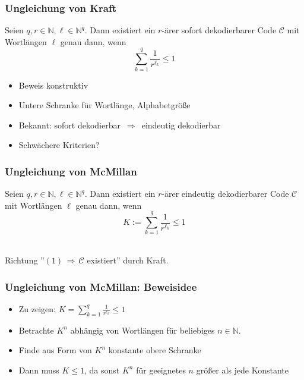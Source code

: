 \documentclass{beamer}
\begin{document}
\begin{frame}[t]
    \frametitle{Ungleichung von Kraft}
    Seien $q,r \in \mathbb{N}, \ell \in \mathbb{N}^q$. Dann existiert ein $r$-ärer sofort dekodierbarer Code $\mathcal{C}$
    mit Wortlängen $\ell$ genau dann, wenn
    $$
        \sum_{k=1}^{q} \frac{1}{r^{\ell_k}} \leq 1
    $$
    \begin{itemize}
        \setlength\itemsep{1em}
        \item Beweis konstruktiv
        \item Untere Schranke für Wortlänge, Alphabetgröße
        \setlength\itemsep{3em}
        \pause
        \item Bekannt: sofort dekodierbar $\,\Longrightarrow\,$ eindeutig dekodierbar
        \setlength\itemsep{1em}
        \item Schwächere Kriterien?
    \end{itemize}
\end{frame}

\begin{frame}[t]
    \frametitle{Ungleichung von McMillan}
    Seien $q,r \in \mathbb{N}, \ell \in \mathbb{N}^q$. Dann existiert ein $r$-ärer eindeutig dekodierbarer Code $\mathcal{C}$
    mit Wortlängen $\ell$ genau dann, wenn
    \begin{equation}
        K := \sum_{k=1}^{q} \frac{1}{r^{\ell_k}} \leq 1
    \end{equation}\\[20pt]
    \pause

    Richtung ''$(1) \,\Longrightarrow\, \mathcal{C}$ existiert'' durch Kraft.\\
\end{frame}

\begin{frame}[t]
    \frametitle{Ungleichung von McMillan: Beweisidee}
    \begin{itemize}
        \setlength\itemsep{1.3em}
        \item Zu zeigen: $K = \sum_{k=1}^{q} \frac{1}{r^{\ell_k}} \leq 1$
        \item Betrachte $K^n$ abhängig von Wortlängen für beliebiges $n \in \mathbb{N}$.
        \item Finde aus Form von $K^n$ konstante obere Schranke
        \item Dann muss $K \leq 1$, da sonst $K^n$ für geeignetes $n$ größer
            als jede Konstante
    \end{itemize}
\end{frame}
\end{document}

